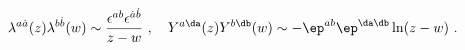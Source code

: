 \begin{equation}
 \lambda^{a \dot{a}} (z) \lambda^{b \dot{b}} (w) \sim 
  \frac{ \epsilon^{ab} \epsilon^{\dot{a} \dot{b}} }{z-w} ~, ~~~
 Y^{a\da}(z)Y^{b\db}(w) \sim - \ep^{ab}\ep^{\da\db} \ln (z-w)~. 
\end{equation}

